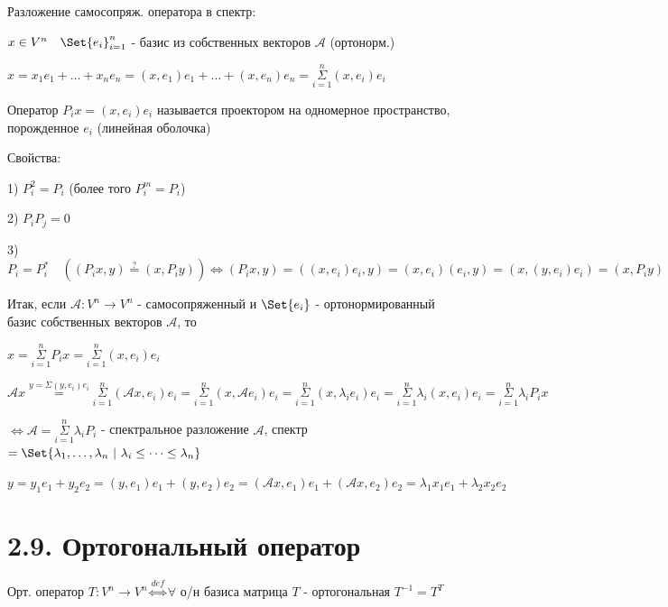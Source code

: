 \documentclass[12pt]{article}
\begin{document}
    Разложение самосопряж. оператора в спектр:

    $x \in V^n \quad \Set{e_i}_{i=1}^n$ - базис из собственных векторов $\mathcal{A}$ (ортонорм.)

    $x = x_1 e_1 + \dots + x_n e_n = (x, e_1) e_1 + \dots + (x, e_n) e_n = \overset{n}{\underset{i = 1}{\Sigma}} (x, e_i) e_i$

    \Def Оператор $P_i x = (x, e_i) e_i$ называется проектором на одномерное пространство, порожденное $e_i$ (линейная оболочка)

    Свойства:

    1) $P_i^2 = P_i$ (более того $P^m_i = P_i$)

    2) $P_i P_j = 0$

    3) $P_i = P_i^* \quad ((P_i x, y) \stackrel{?}{=} (x, P_i y)) \Longleftrightarrow (P_i x, y) = ((x, e_i) e_i, y) = (x, e_i) (e_i, y) = (x, (y, e_i) e_i) = (x, P_i y)$

    Итак, если $\mathcal{A}: V^n \to V^n$ - самосопряженный и $\Set{e_i}$ - ортонормированный базис собственных векторов $\mathcal{A}$, то

    $x = \overset{n}{\underset{i = 1}{\Sigma}} P_i x = \overset{n}{\underset{i = 1}{\Sigma}} (x, e_i) e_i$

    $\mathcal{A} x \stackrel{y = \Sigma (y, e_i) e_i}{=} \overset{n}{\underset{i = 1}{\Sigma}} (\mathcal{A}x, e_i) e_i =
    \overset{n}{\underset{i = 1}{\Sigma}} (x, \mathcal{A}e_i) e_i = \overset{n}{\underset{i = 1}{\Sigma}} (x, \lambda_i e_i) e_i =
    \overset{n}{\underset{i = 1}{\Sigma}} \lambda_i (x, e_i) e_i = \overset{n}{\underset{i = 1}{\Sigma}} \lambda_i P_i x$

    $\Longleftrightarrow \mathcal{A} = \overset{n}{\underset{i = 1}{\Sigma}} \lambda_i P_i$ - спектральное разложение $\mathcal{A}$,
    спектр $= \Set{\lambda_1, \dots, \lambda_n \ | \ \lambda_i \leq \dots \leq \lambda_n}$

    \Ex

    $y = y_1 e_1 + y_2 e_2 = (y, e_1) e_1 + (y, e_2) e_2 = (\mathcal{A}x, e_1) e_1 + (\mathcal{A}x, e_2) e_2 = \lambda_1 x_1 e_1 + \lambda_2 x_2 e_2$

    \section{2.9. Ортогональный оператор}

    \Mem Орт. оператор $T: V^n \to V^n \overset{def}{\Longleftrightarrow} \forall$ о/н базиса матрица $T$ - ортогональная $T^{-1} = T^T$
\end{document}
